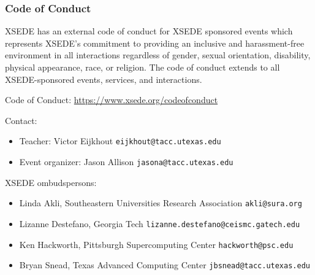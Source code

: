 
\begin{frame}\frametitle{Code of Conduct}
  \scriptsize
  XSEDE has an external code of conduct for XSEDE sponsored events
  which represents XSEDE's commitment to providing an inclusive and
  harassment-free environment in all interactions regardless of
  gender, sexual orientation, disability, physical appearance, race,
  or religion. The code of conduct extends to all XSEDE-sponsored
  events, services, and interactions.

  Code of Conduct: \url{https://www.xsede.org/codeofconduct}

  Contact:
  \begin{itemize}
  \item Teacher: Victor Eijkhout \texttt{eijkhout@tacc.utexas.edu}\\
  \item  Event organizer: Jason Allison  \texttt{jasona@tacc.utexas.edu}
  \end{itemize}
  XSEDE ombudspersons:
  \begin{itemize}
  \item
    Linda Akli, Southeastern Universities Research Association
    \texttt{akli@sura.org}
  \item 
    Lizanne Destefano, Georgia Tech
    \texttt{lizanne.destefano@ceismc.gatech.edu}
  \item 
    Ken Hackworth, Pittsburgh Supercomputing Center \texttt{hackworth@psc.edu}
  \item 
    Bryan Snead, Texas Advanced Computing Center
    \texttt{jbsnead@tacc.utexas.edu}
  \end{itemize}
\end{frame}
